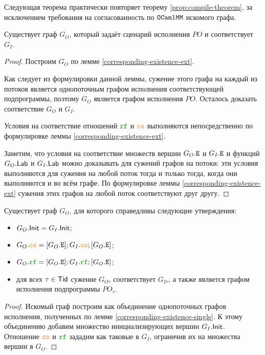 Следующая теорема практически повторяет теорему \ref{prop:compile-theorem}, за исключением требования на согласованность по $\mathtt{OCaml}\allowbreak \mathtt{MM}$ искомого графа. 

\begin{thrm} \label{corresponding-existence}
  Существует граф $G_O$, который задаёт сценарий исполнения $PO$ и соответствует $G_I$. 
\end{thrm}
\begin{proof}
  Построим $G_O$ по лемме \ref{corresponding-existence-ext}. 
  
  Как следует из формулировки данной леммы, сужение этого графа на каждый из потоков является однопоточным графом исполнения соответствующей подпрограммы, поэтому $G_O$ является графом исполнения $PO$. Осталось доказать соответствие $G_O$ и $G_I$. 

  Условия на соответствие отношений $\lRF$ и $\lCO$ выполняются непосредственно по формулировке леммы \ref{corresponding-existence-ext}.

  Заметим, что условия на соответствие множеств вершин $G_O.{\mathtt{E}}$ и $G_I.{\mathtt{E}}$ и функций $G_O.\mathsf{Lab}$ и $G_I.\mathsf{Lab}$ можно доказывать для сужений графов на потоки:  эти условия выполняются для сужения на любой поток тогда и только тогда, когда они выполняются и во всём графе. По формулировке леммы \ref{corresponding-existence-ext} сужения этих графов на любой поток соответствуют друг другу. 
\end{proof}

\begin{lm} \label{corresponding-existence-ext}
  Существует граф $G_O$, для которого справедливы следующие утверждения:
  \begin{itemize}
  \item $G_O.\mathsf{Init}=G_I.\mathsf{Init}$;
  \item $G_O.\lCO = [G_O.\lE]; G_I.\lCO; [G_O.\lE]$;
  \item $G_O.\lRF = [G_O.\lE]; G_I.\lRF; [G_O.\lE]$;
  \item для всех $\tau \in \mathsf{Tid}$ сужение $G_{O\tau}$ соответствует $G_{I\tau}$, а также является графом исполнения подпрограммы $PO_\tau$. 
  \end{itemize}
\end{lm}
\begin{proof}
  Искомый граф построим как объединение однопоточных графов исполнения, полученных по лемме \ref{corresponding-existence-single}. К этому объединению добавим множество инициализирующих вершин $G_I.\mathsf{Init}$. Отношение $\lCO$ и $\lRF$ зададим как таковые в $G_I$, ограничив их на множества вершин в $G_O$. 
\end{proof}

